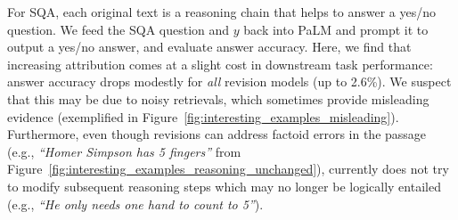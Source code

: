 For SQA, each original text is a reasoning chain that helps to answer a yes/no question. 
We feed the SQA question and $y$ back into PaLM and prompt it to output a yes/no answer, and evaluate answer accuracy. Here, we find that increasing attribution comes at a slight cost in downstream task performance: answer accuracy drops modestly for \emph{all} revision models (up to 2.6\%). 
We suspect that this may be due to noisy retrievals, which sometimes provide misleading evidence (exemplified in Figure~\ref{fig:interesting_examples_misleading}).
Furthermore, even though revisions can address factoid errors in the passage (e.g., \emph{``Homer Simpson has 5 fingers''} from Figure~\ref{fig:interesting_examples_reasoning_unchanged}), \approach{} currently does not try to modify subsequent reasoning steps which may no longer be logically entailed (e.g., \emph{``He only needs one hand to count to 5''}).











